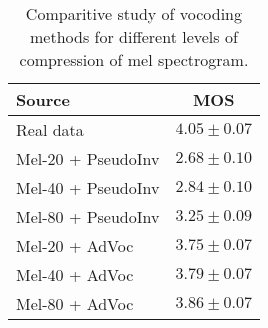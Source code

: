 \documentclass[a4paper]{article}
\begin{document}



\begin{table}[htbp]
\centering
\caption{Comparitive study of vocoding methods for different levels of compression of mel spectrogram. }
\footnotesize
\begin{tabular}{lc}
\toprule
Source & MOS \\
\midrule
Real data & $4.05 \pm 0.07$ \\
Mel-20 + PseudoInv & $2.68 \pm 0.10$ \\
Mel-40 + PseudoInv & $2.84 \pm 0.10$ \\
Mel-80 + PseudoInv & $3.25 \pm 0.09$ \\
Mel-20 + AdVoc & $3.75 \pm 0.07$ \\
Mel-40 + AdVoc & $3.79 \pm 0.07$ \\
Mel-80 + AdVoc & $3.86 \pm 0.07$ \\
\bottomrule
\end{tabular}
\label{tab:compression}
\end{table}








\end{document}

